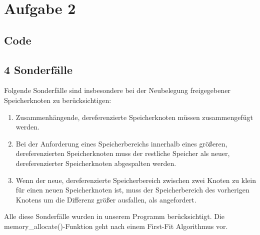 \documentclass[numbers=noendperiod]{scrartcl}
\begin{document}
\section*{Aufgabe 2}
\subsection*{Code}




\subsection*{4 Sonderfälle}
Folgende Sonderfälle sind insbesondere bei der Neubelegung freigegebener Speicherknoten zu berücksichtigen:
\begin{enumerate}
	\item Zusammenhängende, dereferenzierte Speicherknoten müssen zusammengefügt werden.
	\item Bei der Anforderung eines Speicherbereichs innerhalb eines größeren, dereferenzierten Speicherknoten muss der restliche Speicher als neuer, dereferenzierter Speicherknoten abgespalten werden.
	\item Wenn der neue, dereferenzierte Speicherbereich zwischen zwei Knoten zu klein für einen neuen Speicherknoten ist, muss der Speicherbereich des vorherigen Knotens um die Differenz größer ausfallen, als angefordert.
\end{enumerate}
Alle diese Sonderfälle wurden in unserem Programm berücksichtigt. Die memory\_allocate()-Funktion geht nach einem First-Fit Algorithmus vor.
	
\end{document}
